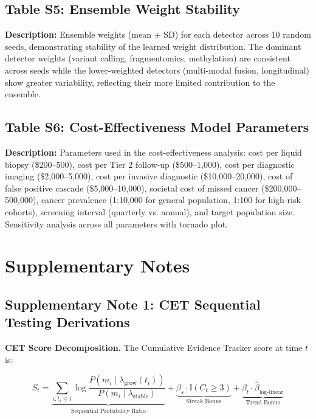 \documentclass[10pt,a4paper]{article}
\begin{document}
\subsection*{Table S5: Ensemble Weight Stability}
\textbf{Description:} Ensemble weights (mean $\pm$ SD) for each detector across 10 random seeds, demonstrating stability of the learned weight distribution. The dominant detector weights (variant calling, fragmentomics, methylation) are consistent across seeds while the lower-weighted detectors (multi-modal fusion, longitudinal) show greater variability, reflecting their more limited contribution to the ensemble.

\subsection*{Table S6: Cost-Effectiveness Model Parameters}
\textbf{Description:} Parameters used in the cost-effectiveness analysis: cost per liquid biopsy (\$200--500), cost per Tier 2 follow-up (\$500--1,000), cost per diagnostic imaging (\$2,000--5,000), cost per invasive diagnostic (\$10,000--20,000), cost of false positive cascade (\$5,000--10,000), societal cost of missed cancer (\$200,000--500,000), cancer prevalence (1:10,000 for general population, 1:100 for high-risk cohorts), screening interval (quarterly vs. annual), and target population size. Sensitivity analysis across all parameters with tornado plot.

\newpage

\section{Supplementary Notes}

\subsection*{Supplementary Note 1: CET Sequential Testing Derivations}

\textbf{CET Score Decomposition.} The Cumulative Evidence Tracker score at time $t$ is:

\begin{equation}
S_t = \underbrace{\sum_{i: t_i \leq t} \log \frac{P(m_i \mid \lambda_{\text{grow}}(t_i))}{P(m_i \mid \lambda_{\text{stable}})}}_{\text{Sequential Probability Ratio}} + \underbrace{\beta_s \cdot \mathbb{I}(C_t \geq 3)}_{\text{Streak Bonus}} + \underbrace{\beta_t \cdot \hat{\beta}_{\text{log-linear}}}_{\text{Trend Bonus}}
\end{equation}
\end{document}
